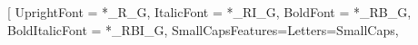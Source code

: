 \usepackage{ifxetex}
%
\usepackage{ifpdf} %
%
%
\usepackage[%
   centertags, %
   sumlimits,  %
   intlimits,  %
   namelimits, %
   fleqn,     %
]{amsmath} %
%
\usepackage{amsfonts}
\usepackage[fixamsmath,disallowspaces]{mathtools}
\usepackage{fixmath}
%
\def\UseLibertinusSTIXMix{true}
%
%
\makeatletter
\ifxetex %
  \usepackage{xltxtra}
	\usepackage{unicode-math}
	\ifdefined\UseLibertine
		\setmainfont[
								UprightFont = *_R_G,
								ItalicFont = *_RI_G,
								BoldFont = *_RB_G,
								BoldItalicFont = *_RBI_G,
								SmallCapsFeatures={Letters=SmallCaps},
